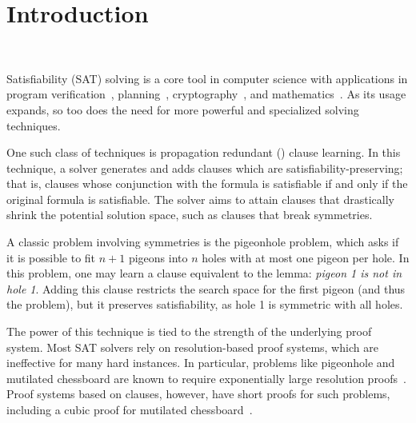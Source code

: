 \section{Introduction}~\label{sec:intro}


Satisfiability (SAT) solving is a core tool in computer science with applications in program verification~\cite{BillionQueries,sat-hardwareverification,ic3,bmc}, planning~\cite{planning,planningassat}, cryptography~\cite{cryptominisat}, and mathematics~\cite{chromaticnumber,pythagoreantriples,kellersconjecture,emptyhexagon}. As its usage expands, so too does the need for more powerful and specialized solving techniques.



One such class of techniques is propagation redundant (\pr) clause learning. In this technique, a solver generates and adds clauses which are satisfiability-preserving; that is, clauses whose conjunction with the formula is satisfiable if and only if the original formula is satisfiable. The solver aims to attain clauses that drastically shrink the potential solution space, such as clauses that break symmetries.

A classic problem involving symmetries is the pigeonhole problem, which asks if it is possible to fit $n+1$ pigeons into $n$ holes with at most one pigeon per hole. In this problem, one may learn a clause equivalent to the lemma: \emph{pigeon 1 is not in hole 1}. Adding this clause restricts the search space for the first pigeon (and thus the problem), but it preserves satisfiability, as hole 1 is symmetric with all holes.



The power of this technique is tied to the strength of the underlying proof system. Most SAT solvers rely on resolution-based proof systems, which are ineffective for many hard instances. In particular, problems like pigeonhole and mutilated chessboard are known to require exponentially large resolution proofs~\cite{hakenpigeonhole,mutilatedchessboard-exponential}. Proof systems based on \pr clauses, however, have short proofs for such problems, including a cubic proof for mutilated chessboard~\cite{mutilatedchessboard-pr}.

